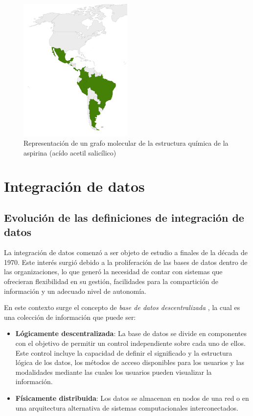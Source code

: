     \begin{figure}[h!]
        \centering
        \includegraphics[width=0.5\textwidth]{Images/npdb-map.png}
        \caption{Representación de un grafo molecular de la estructura química de la aspirina (acído acetil salicílico)}
        \label{fig:np-graph-representation}
    \end{figure}


\section{Integraci\'on de datos}

\subsection{Evolución de las definiciones de integración de datos}

La integración de datos comenzó a ser objeto de estudio a finales de la década de
1970. Este interés surgió debido a la proliferación de las bases de datos dentro de las organizaciones,
lo que generó la necesidad de contar con sistemas que ofrecieran flexibilidad en su gestión, 
facilidades para la compartición de información y un adecuado nivel de autonomía.

En este contexto surge el concepto de \textit{base de datos descentralizada} \cite{mcleod1980federated}, la cual es una
colección de información que puede ser:
\begin{itemize}
    \item \textbf{Lógicamente descentralizada}: La base de datos se divide en componentes con el objetivo
    de permitir un control independiente sobre cada uno de ellos. Este control incluye la capacidad de definir
    el significado y la estructura lógica de los datos, los métodos de acceso disponibles para los usuarios y las
    modalidades mediante las cuales los usuarios pueden visualizar la información.
    \item \textbf{Físicamente distribuida}: Los datos se almacenan en nodos de una red o en una arquitectura alternativa de
    sistemas computacionales interconectados.
\end{itemize}

